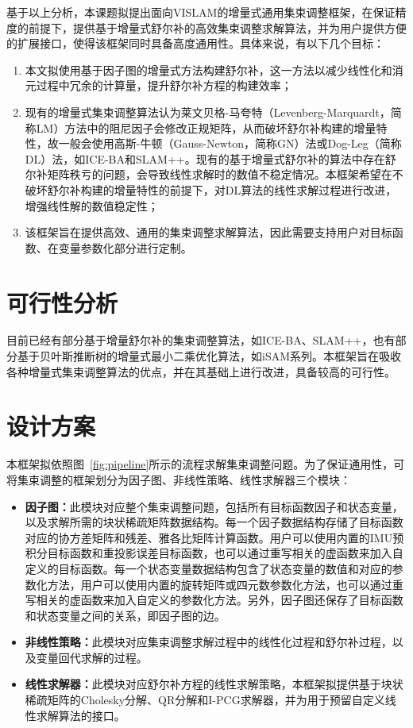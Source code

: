 \documentclass[oneside]{ZJUthesis}
\begin{document}
基于以上分析，本课题拟提出面向VISLAM的增量式通用集束调整框架，在保证精度的前提下，提供基于增量式舒尔补的高效集束调整求解算法，并为用户提供方便的扩展接口，使得该框架同时具备高度通用性。具体来说，有以下几个目标：
\begin{enumerate}
    \item 本文拟使用基于因子图的增量式方法构建舒尔补，这一方法以减少线性化和消元过程中冗余的计算量，提升舒尔补方程的构建效率；
    \item 现有的增量式集束调整算法认为莱文贝格-马夸特（Levenberg-Marquardt，简称LM）方法中的阻尼因子会修改正规矩阵，从而破坏舒尔补构建的增量特性，故一般会使用高斯-牛顿（Gauss-Newton，简称GN）法或Dog-Leg（简称DL）法，如ICE-BA\citep{liu2018ice}和SLAM++。现有的基于增量式舒尔补的算法中存在舒尔补矩阵秩亏的问题，会导致线性求解时的数值不稳定情况。本框架希望在不破坏舒尔补构建的增量特性的前提下，对DL算法的线性求解过程进行改进，增强线性解的数值稳定性；
    \item 该框架旨在提供高效、通用的集束调整求解算法，因此需要支持用户对目标函数、在变量参数化部分进行定制。
\end{enumerate}

\section{可行性分析}

目前已经有部分基于增量舒尔补的集束调整算法，如ICE-BA、SLAM++，也有部分基于贝叶斯推断树的增量式最小二乘优化算法，如iSAM系列。本框架旨在吸收各种增量式集束调整算法的优点，并在其基础上进行改进，具备较高的可行性。

\section{设计方案}

本框架拟依照图~\ref{fig:pipeline}所示的流程求解集束调整问题。为了保证通用性，可将集束调整的框架划分为因子图、非线性策略、线性求解器三个模块：
\begin{itemize}
    \item \textbf{因子图：}此模块对应整个集束调整问题，包括所有目标函数因子和状态变量，以及求解所需的块状稀疏矩阵数据结构。每一个因子数据结构存储了目标函数对应的协方差矩阵和残差、雅各比矩阵计算函数。用户可以使用内置的IMU预积分目标函数和重投影误差目标函数，也可以通过重写相关的虚函数来加入自定义的目标函数。每一个状态变量数据结构包含了状态变量的数值和对应的参数化方法，用户可以使用内置的旋转矩阵或四元数参数化方法，也可以通过重写相关的虚函数来加入自定义的参数化方法。另外，因子图还保存了目标函数和状态变量之间的关系，即因子图的边。
    \item \textbf{非线性策略：}此模块对应集束调整求解过程中的线性化过程和舒尔补过程，以及变量回代求解的过程。
    \item \textbf{线性求解器：}此模块对应舒尔补方程的线性求解策略，本框架拟提供基于块状稀疏矩阵的Cholesky分解、QR分解和I-PCG求解器，并为用于预留自定义线性求解算法的接口。
\end{itemize}
\end{document}
